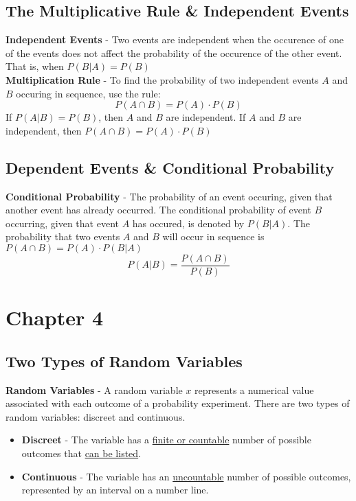 \documentclass[a4paper]{article}
\let\bf\textbf
\begin{document}

\subsection{The Multiplicative Rule \& Independent Events}
\bf{Independent Events} - Two events are independent when the occurence of one of the events does not affect the probability of the occurence of the other event. That is, when $P(B|A) = P(B)$
\vspace{2mm}\\
\noindent\bf{Multiplication Rule} - To find the probability of two independent events $A$ and $B$ occuring in sequence, use the rule:
\begin{equation}
    P(A \cap B) = P(A) \cdot P(B)
\end{equation}
\noindent If $P(A | B) = P(B)$, then  $A$ and $B$ are independent. If $A$ and $B$ are independent, then $P(A \cap B) = P(A) \cdot P(B)$
\subsection{Dependent Events \& Conditional Probability}
\bf{Conditional Probability} - The probability of an event occuring, given that another event has already occurred. The conditional probability of event $B$ occurring, given that event $A$ has occured, is denoted by $P(B|A)$. The probability that two events $A$ and $B$ will occur in sequence is $P(A \cap B) = P(A) \cdot P(B|A)$
\begin{equation}
    P(A|B) = \frac{P(A \cap B)}{P(B)}
\end{equation}
\section{Chapter 4}
\subsection{Two Types of Random Variables}
\bf{Random Variables} - A random variable $x$ represents a numerical value associated with each outcome of a probability experiment. There are two types of random variables: discreet and continuous.
\begin{itemize}
    \item \bf{Discreet} - The variable has a \underline{finite or countable} number of possible outcomes that \underline{can be listed}.
    \item \bf{Continuous} - The variable has an \underline{uncountable} number of possible outcomes, represented by an interval on a number line.
\end{itemize}
\end{document}
